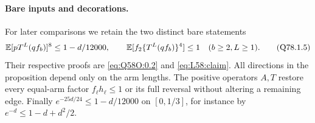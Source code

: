 \paragraph{Bare inputs and decorations.}\label{part:root-post:bare}
For later comparisons we retain the two distinct bare statements
\[
 \mathbb E[pT^L(qf_b)]^8\le1-d/12000,\qquad
 \mathbb E[f_2\{T^L(qf_b)\}^4]\le1
 \quad(b\ge2,L\ge1).
 \tag{Q78.1.5}
\]
Their respective proofs are \eqref{eq:Q58O:0.2} and \eqref{eq:L58:claim}.
All directions in the proposition depend only on the arm lengths.
The positive operators \(A,T\) restore every equal-arm factor
\(f_\ell h_\ell\le1\) or its full reversal without altering a
remaining edge. Finally \(e^{-25d/24}\le1-d/12000\) on
\([0,1/3]\), for instance by \(e^{-d}\le1-d+d^2/2\).
